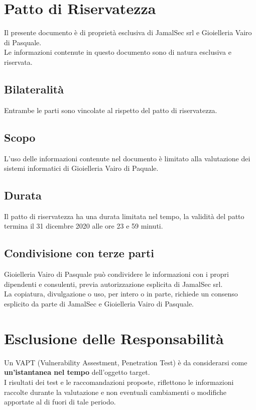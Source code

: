 \begin{cvletter}
   \color{text}
   \section{Patto di Riservatezza\ \color{gray}\vhrulefill{0.9pt}}
   Il presente documento è di proprietà esclusiva di JamalSec srl e Gioielleria Vairo di Pasquale.\\
   Le informazioni contenute in questo documento sono di natura esclusiva e riservata.
   \subsection{Bilateralità} 
   Entrambe le parti sono vincolate al rispetto del patto di riservatezza.
   \subsection{Scopo} 
   L'uso delle informazioni contenute nel documento è limitato alla valutazione dei sistemi informatici di Gioielleria Vairo di Paquale.
   \subsection{Durata} 
   Il patto di riservatezza ha una durata limitata nel tempo, la validità del patto termina il 31 dicembre 2020 alle ore 23 e 59 minuti.
   \subsection{Condivisione con terze parti} 
   Gioielleria Vairo di Pasquale può condividere le informazioni con i propri dipendenti e consulenti, previa autorizzazione esplicita di JamalSec srl.\\
   La copiatura, divulgazione o uso, per intero o in parte, richiede un consenso esplicito da parte di JamalSec e Gioielleria Vairo di Pasquale.\\

   \section{Esclusione delle Responsabilità\ \color{gray}\vhrulefill{0.9pt}}
   Un VAPT (Vulnerability Assestment, Penetration Test) è da considerarsi come \textbf{un’istantanea nel tempo} dell’oggetto target.\\
   I risultati dei test e le raccomandazioni proposte, riflettono le informazioni raccolte durante la valutazione e non eventuali cambiamenti o modifiche apportate al di fuori di tale periodo.\\


\end{cvletter}
